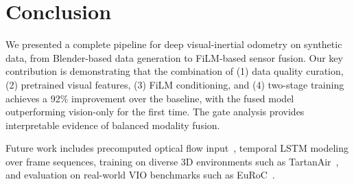 \documentclass[conference]{IEEEtran}
\begin{document}
\section{Conclusion}

We presented a complete pipeline for deep visual-inertial odometry on synthetic data, from Blender-based data generation to FiLM-based sensor fusion. Our key contribution is demonstrating that the combination of (1) data quality curation, (2) pretrained visual features, (3) FiLM conditioning, and (4) two-stage training achieves a 92\% improvement over the baseline, with the fused model outperforming vision-only for the first time. The gate analysis provides interpretable evidence of balanced modality fusion.

Future work includes precomputed optical flow input~\cite{wang2021, teed2020}, temporal LSTM modeling over frame sequences, training on diverse 3D environments such as TartanAir~\cite{wang2020tartanair}, and evaluation on real-world VIO benchmarks such as EuRoC~\cite{burri2016}.
\end{document}
